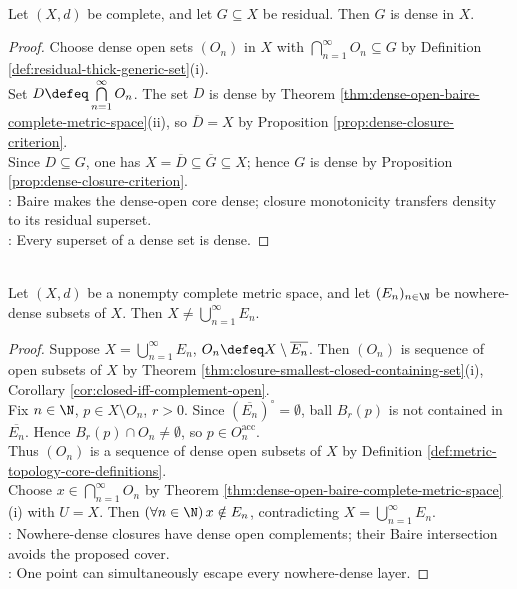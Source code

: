 \begin{corollary} \label{cor:residual-subsets-of-complete-metric-spaces-dense} \\
Let $(X,d)$ be complete, and let $G\subseteq X$ be residual. Then $G$ is dense in $X$.
\begin{proof}
Choose dense open sets $(O_n)$ in $X$ with $\bigcap\limits_{n=1}^{\infty}O_n\subseteq G$ by Definition \ref{def:residual-thick-generic-set}(i).\\
Set $D\defeq\bigcap\limits_{n=1}^{\infty}O_n$. The set $D$ is dense by Theorem \ref{thm:dense-open-baire-complete-metric-space}(ii), so $\overline{D}=X$ by Proposition \ref{prop:dense-closure-criterion}.\\
Since $D\subseteq G$, one has $X=\overline{D}\subseteq\overline{G}\subseteq X$; hence $G$ is dense by Proposition \ref{prop:dense-closure-criterion}.\\
: Baire makes the dense-open core dense; closure monotonicity transfers density to its residual superset.\\
: Every superset of a dense set is dense.
\end{proof}
\end{corollary}

\begin{theorem} \label{thm:baire-category-complete-metric-space} \\
Let $(X,d)$ be a nonempty complete metric space, and let $(E_n)_{n\in\N}$ be nowhere-dense subsets of $X$. Then $X\ne\bigcup\limits_{n=1}^{\infty}E_n$.
\begin{proof}
Suppose $X=\bigcup\limits_{n=1}^{\infty}E_n$, $O_n\defeq X\setminus\overline{E_n}$. Then $(O_n)$ is sequence of open subsets of $X$ by Theorem \ref{thm:closure-smallest-closed-containing-set}(i), Corollary \ref{cor:closed-iff-complement-open}.\\
Fix $n\in\N$, $p\in X\setminus O_n$, $r>0$. Since $(\overline{E_n})^\circ=\emptyset$, ball $B_r(p)$ is not contained in $\overline{E_n}$. Hence $B_r(p)\cap O_n\ne\emptyset$, so $p\in O_n^{\operatorname{acc}}$.\\
Thus $(O_n)$ is a sequence of dense open subsets of $X$ by Definition \ref{def:metric-topology-core-definitions}.\\
Choose $x\in\bigcap\limits_{n=1}^{\infty}O_n$ by Theorem \ref{thm:dense-open-baire-complete-metric-space}(i) with $U=X$. Then $(\forall n\in\N)\,x\notin E_n$, contradicting $X=\bigcup\limits_{n=1}^{\infty}E_n$.\\
: Nowhere-dense closures have dense open complements; their Baire intersection avoids the proposed cover.\\
: One point can simultaneously escape every nowhere-dense layer.
\end{proof}
\end{theorem}

